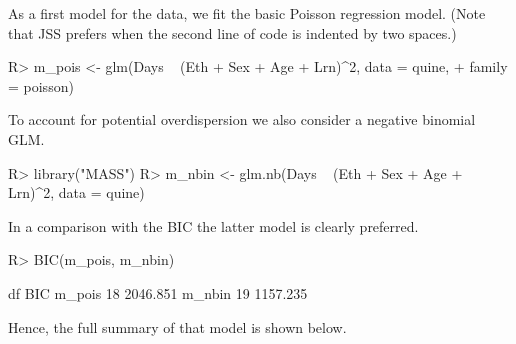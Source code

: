 \documentclass[article]{jss}
\begin{document}
As a first model for the  data, we fit the basic Poisson regression
model. (Note that JSS prefers when the second line of code is indented by two
spaces.)
%
\begin{CodeChunk}
\begin{CodeInput}
R> m_pois <- glm(Days ~ (Eth + Sex + Age + Lrn)^2, data = quine,
+    family = poisson)
\end{CodeInput}
\end{CodeChunk}
%
To account for potential overdispersion we also consider a negative binomial
GLM.
%
\begin{CodeChunk}
\begin{CodeInput}
R> library("MASS")
R> m_nbin <- glm.nb(Days ~ (Eth + Sex + Age + Lrn)^2, data = quine)
\end{CodeInput}
\end{CodeChunk}
%
In a comparison with the BIC the latter model is clearly preferred.
%
\begin{CodeChunk}
\begin{CodeInput}
R> BIC(m_pois, m_nbin)
\end{CodeInput}
\begin{CodeOutput}
       df      BIC
m_pois 18 2046.851
m_nbin 19 1157.235
\end{CodeOutput}
\end{CodeChunk}
%
Hence, the full summary of that model is shown below.
%
\end{document}
